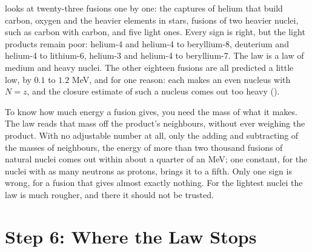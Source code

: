 \begin{table}[tbp]
\myfloatalign
\footnotesize

\caption[Twenty-three fusions]{Twenty-three fusions of the stars and of the laboratory: the twelve captures of helium-4 that climb from beryllium-8 to nickel-56, the fusions of carbon, oxygen, neon, magnesium and silicon with themselves and of carbon with oxygen, and five light ones. $Q$ in MeV: measured, predicted by Law~\ref{law:closure}, and the miss, predicted minus measured. The error is $1.10$ MeV, root mean square, and every sign is right.}
\label{tab:cl-23}
\end{table}

 looks at twenty-three fusions one by one: the captures of helium that build carbon, oxygen and the heavier elements in stars, fusions of two heavier nuclei, such as carbon with carbon, and five light ones. Every sign is right, but the light products remain poor: helium-4 and helium-4 to beryllium-8, deuterium and helium-4 to lithium-6, helium-3 and helium-4 to beryllium-7. The law is a law of medium and heavy nuclei. The other eighteen fusions are all predicted a little low, by $0.1$ to $1.2$ MeV, and for one reason: each makes an even nucleus with $N = z$, and the closure estimate of such a nucleus comes out too heavy ().

\begin{plainwords}
To know how much energy a fusion gives, you need the mass of what it makes. The law reads that mass off the product's neighbours, without ever weighing the product. With no adjustable number at all, only the adding and subtracting of the masses of neighbours, the energy of more than two thousand fusions of natural nuclei comes out within about a quarter of an MeV; one constant, for the nuclei with as many neutrons as protons, brings it to a fifth. Only one sign is wrong, for a fusion that gives almost exactly nothing. For the lightest nuclei the law is much rougher, and there it should not be trusted.
\end{plainwords}

\section{Step 6: Where the Law Stops}\label{sec:cl-limits}

